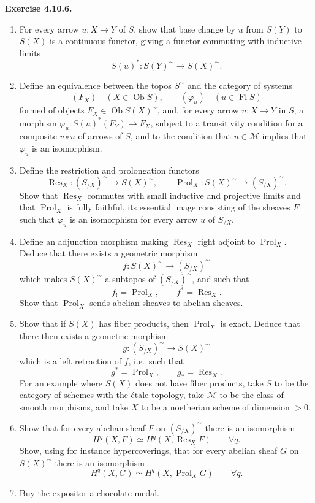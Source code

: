 \documentclass[11pt]{article}
\newcommand{\M}{\mathcal{M}}
\newcommand{\Ob}{\operatorname{Ob}}
\newcommand{\Fl}{\operatorname{Fl}}
\newcommand{\Res}{\operatorname{Res}}
\newcommand{\Prol}{\operatorname{Prol}}
\newcommand{\ie}{i.e.}
\newenvironment{remarktext}[1]{\par\medskip\noindent\textbf{#1.}\ }{\par\medskip}
\providecommand{\Ob}{\operatorname{Ob}}
\begin{document}
\begin{remarktext}{Exercise 4.10.6}
\begin{enumerate}[label=\arabic*)]
\item For every arrow \(u:X\to Y\) of \(S\), show that base change by \(u\) from \(S(Y)\) to \(S(X)\) is a continuous functor, giving a functor commuting with inductive limits
\[
S(u)^\ast:S(Y)^{\sim}\longrightarrow S(X)^{\sim}.
\]
\item Define an equivalence between the topos \(S^{\sim}\) and the category of systems
\[
(F_X)\quad(X\in\Ob S),
\qquad
(\varphi_u)\quad(u\in\Fl S)
\]
formed of objects \(F_X\in\Ob S(X)^{\sim}\), and, for every arrow \(u:X\to Y\) in \(S\), a morphism \(\varphi_u:S(u)^\ast(F_Y)\to F_X\), subject to a transitivity condition for a composite \(v\circ u\) of arrows of \(S\), and to the condition that \(u\in\M\) implies that \(\varphi_u\) is an isomorphism.
\item Define the restriction and prolongation functors
\[
\Res_X:(S_{/X})^{\sim}\longrightarrow S(X)^{\sim},
\qquad
\Prol_X:S(X)^{\sim}\longrightarrow(S_{/X})^{\sim}.
\]
Show that \(\Res_X\) commutes with small inductive and projective limits and that \(\Prol_X\) is fully faithful, its essential image consisting of the sheaves \(F\) such that \(\varphi_u\) is an isomorphism for every arrow \(u\) of \(S_{/X}\).
\item Define an adjunction morphism making \(\Res_X\) right adjoint to \(\Prol_X\). Deduce that there exists a geometric morphism
\[
f:S(X)^{\sim}\longrightarrow(S_{/X})^{\sim}
\]
which makes \(S(X)^{\sim}\) a subtopos of \((S_{/X})^{\sim}\), and such that
\[
f_!=\Prol_X,
\qquad
f^\ast=\Res_X.
\]
Show that \(\Prol_X\) sends abelian sheaves to abelian sheaves.
\item Show that if \(S(X)\) has fiber products, then \(\Prol_X\) is exact. Deduce that there then exists a geometric morphism
\[
g:(S_{/X})^{\sim}\longrightarrow S(X)^{\sim}
\]
which is a left retraction of \(f\), \ie\ such that
\[
g^\ast=\Prol_X,
\qquad
g_\ast=\Res_X.
\]
For an example where \(S(X)\) does not have fiber products, take \(S\) to be the category of schemes with the \'etale topology, take \(\M\) to be the class of smooth morphisms, and take \(X\) to be a noetherian scheme of dimension \(>0\).
\item Show that for every abelian sheaf \(F\) on \((S_{/X})^{\sim}\) there is an isomorphism
\[
H^q(X,F)\simeq H^q(X,\Res_XF)\qquad\forall q.
\]
Show, using for instance hypercoverings, that for every abelian sheaf \(G\) on \(S(X)^{\sim}\) there is an isomorphism
\[
H^q(X,G)\simeq H^q(X,\Prol_XG)\qquad\forall q.
\]
\item Buy the expositor a chocolate medal.
\end{enumerate}
\end{remarktext}
\end{document}
